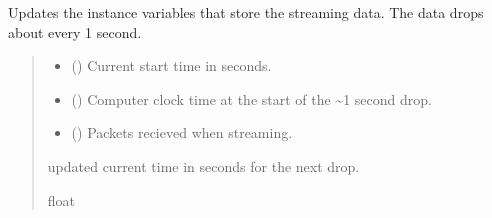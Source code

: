 \documentclass[letterpaper,10pt,english]{sphinxmanual}
\begin{document}
\begin{fulllineitems}
\begin{fulllineitems}
\label{\detokenize{Morelia.Stream.Collect:Morelia.Stream.Collect.DataHose.Hose._Drop}}
\pysigstartsignatures
{}
\pysigstopsignatures
\sphinxAtStartPar
Updates the instance variables that store the streaming data.         The data drops about every 1 second.
\begin{quote}\begin{description}
\begin{itemize}
\item {} 
\sphinxAtStartPar
{} () \textendash{} Current start time in seconds.

\item {} 
\sphinxAtStartPar
{} () \textendash{} Computer clock time at the start of the \textasciitilde{}1 second drop.

\item {} 
\sphinxAtStartPar
{} (\sphinxstyleliteralemphasis{\sphinxupquote{{[}}}{\hyperref[\detokenize{Morelia.Packets:Morelia.Packets.Packet.Packet}]{\sphinxcrossref{\sphinxstyleliteralemphasis{\sphinxupquote{Packet}}}}}\sphinxstyleliteralemphasis{\sphinxupquote{ | }}\sphinxstyleliteralemphasis{\sphinxupquote{{]}}}) \textendash{} Packets recieved when streaming.

\end{itemize}

\sphinxAtStartPar
updated current time in seconds for the next drop.

\sphinxAtStartPar
float

\end{description}\end{quote}


\end{fulllineitems}
\end{fulllineitems}
\end{document}
